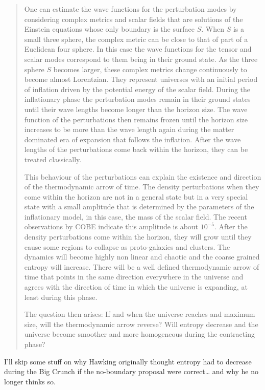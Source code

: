 \documentclass{article}
\begin{document}
\begin{quote}

One can estimate the wave functions for the perturbation modes by
considering complex metrics and scalar fields that are solutions of the
Einstein equations whose only boundary is the surface \(S\). When \(S\)
is a small three sphere, the complex metric can be close to that of part
of a Euclidean four sphere. In this case the wave functions for the
tensor and scalar modes correspond to them being in their ground state.
As the three sphere \(S\) becomes larger, these complex metrics change
continuously to become almost Lorentzian. They represent universes with
an initial period of inflation driven by the potential energy of the
scalar field. During the inflationary phase the perturbation modes
remain in their ground states until their wave lengths become longer
than the horizon size. The wave function of the perturbations then
remains frozen until the horizon size increases to be more than the wave
length again during the matter dominated era of expansion that follows
the inflation. After the wave lengths of the perturbations come back
within the horizon, they can be treated classically.

This behaviour of the perturbations can explain the existence and
direction of the thermodynamic arrow of time. The density perturbations
when they come within the horizon are not in a general state but in a
very special state with a small amplitude that is determined by the
parameters of the inflationary model, in this case, the mass of the
scalar field. The recent observations by COBE indicate this amplitude is
about \(10^{-5}\). After the density perturbations come within the
horizon, they will grow until they cause some regions to collapse as
proto-galaxies and clusters. The dynamics will become highly non linear
and chaotic and the coarse grained entropy will increase. There will be
a well defined thermodynamic arrow of time that points in the same
direction everywhere in the universe and agrees with the direction of
time in which the universe is expanding, at least during this phase.

The question then arises: If and when the universe reaches and maximum
size, will the thermodynamic arrow reverse? Will entropy decrease and
the universe become smoother and more homogeneous during the contracting
phase?

\end{quote}

\noindent
I'll skip some stuff on why Hawking originally thought entropy had to
decrease during the Big Crunch if the no-boundary proposal were
correct\ldots{} and why he no longer thinks so.
\end{document}
